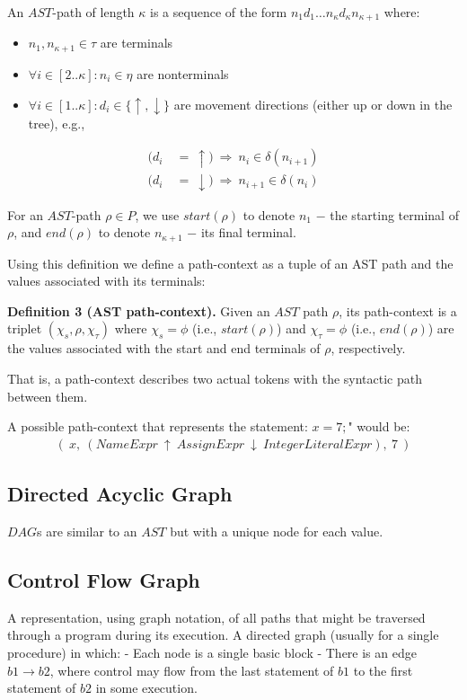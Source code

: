  An $AST$-path of length $\kappa$ is a sequence of the form $n_{1}d_{1} \dots n_{\kappa}d_{\kappa} n_{\kappa+1}$ where:
\begin{itemize}
  \item $n_{1},n_{\kappa+1} \in \tau$ are terminals
  \item $\forall i \in [2..\kappa]: n_{i} \in \eta$ are nonterminals
  \item $\forall i \in [1..\kappa]: d_{i} \in {\{\uparrow,\downarrow\}}$ are movement directions (either up or down in the tree), e.g.,
\end{itemize}
%
\begin{align}
(d_{i}\ &=\ \uparrow)  \ \Rightarrow\ n_{i} \in \delta (n_{i+1} ) \\
(d_{i}\ &=\ \downarrow)\ \Rightarrow\ n_{i+1} \in \delta (n_{i})
\end{align}

For an $AST$-path $\rho \in P$, we use $start(\rho)$ to denote $n_{1}$ $-$ the starting terminal of $\rho$, and $end(\rho)$ to denote $n_{\kappa+1}$ $-$ its final terminal.

Using this definition we define a   path-context   as a tuple of an AST path and the values associated with its terminals:

\textbf{Definition 3 (AST path-context).} Given an $AST$ path $\rho$, its path-context is a triplet $( \chi_{s}, \rho, \chi_{\tau} )$ where $\chi_{s} = \phi$ (i.e., $start(\rho)$) and $\chi_{\tau} = \phi$ (i.e., $end(\rho)$)   are the values associated with the start and end terminals of $\rho$, respectively. 

That is, a path-context describes two actual tokens with the syntactic path between them.

 A possible path-context that represents the statement: $x = 7;$" would be:
%
\begin{align}
(\ x,\ (NameExpr\ \uparrow\ AssignExpr\ \downarrow\ IntegerLiteralExpr),\ 7\ )
\end{align}

\subsection{Directed Acyclic Graph} 
$DAG$s are similar to an $AST$ but with a unique node for each value.

\subsection{Control Flow Graph}
A representation, using graph notation, of all paths that might be traversed through a program during its execution. A directed graph (usually for a single procedure) in which: 
- Each node is a single basic block
- There is an edge $b1→b2$, where control may flow from the last statement of $b1$ to the first statement of $b2$ in some execution.

